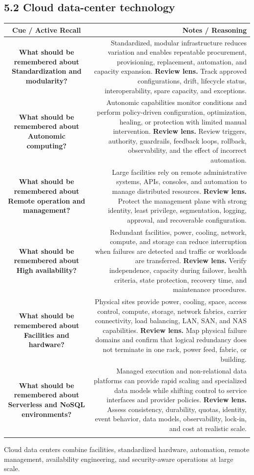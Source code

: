 \documentclass[11pt]{article}
\newcommand{\CornellHeader}{\rowcolor{Navy}\color{white}\bfseries Cue / Active Recall & \color{white}\bfseries Notes / Reasoning \\\endhead}
\newcommand{\CornellRow}[2]{\cellcolor{CueGray}\textbf{#1} & #2 \\\addlinespace[3pt]}
\begin{document}
\subsection{5.2 Cloud data-center technology}
\begin{longtable}{@{}C N@{}}
\CornellHeader
\CornellRow{What should be remembered about Standardization and modularity?}{Standardized, modular infrastructure reduces variation and enables repeatable procurement, provisioning, replacement, automation, and capacity expansion. \textbf{Review lens.} Track approved configurations, drift, lifecycle status, interoperability, spare capacity, and exceptions.}
\CornellRow{What should be remembered about Autonomic computing?}{Autonomic capabilities monitor conditions and perform policy-driven configuration, optimization, healing, or protection with limited manual intervention. \textbf{Review lens.} Review triggers, authority, guardrails, feedback loops, rollback, observability, and the effect of incorrect automation.}
\CornellRow{What should be remembered about Remote operation and management?}{Large facilities rely on remote administrative systems, APIs, consoles, and automation to manage distributed resources. \textbf{Review lens.} Protect the management plane with strong identity, least privilege, segmentation, logging, approval, and recoverable configuration.}
\CornellRow{What should be remembered about High availability?}{Redundant facilities, power, cooling, network, compute, and storage can reduce interruption when failures are detected and traffic or workloads are transferred. \textbf{Review lens.} Verify independence, capacity during failover, health criteria, state protection, recovery time, and maintenance procedures.}
\CornellRow{What should be remembered about Facilities and hardware?}{Physical sites provide power, cooling, space, access control, compute, storage, network fabrics, carrier connectivity, load balancing, LAN, SAN, and NAS capabilities. \textbf{Review lens.} Map physical failure domains and confirm that logical redundancy does not terminate in one rack, power feed, fabric, or building.}
\CornellRow{What should be remembered about Serverless and NoSQL environments?}{Managed execution and non-relational data platforms can provide rapid scaling and specialized data models while shifting control to service interfaces and provider policies. \textbf{Review lens.} Assess consistency, durability, quotas, identity, event behavior, data models, observability, lock-in, and cost at realistic scale.}
\end{longtable}
\begin{sectionsummarybox}
Cloud data centers combine facilities, standardized hardware, automation, remote management, availability engineering, and security-aware operations at large scale.
\end{sectionsummarybox}
\end{document}
